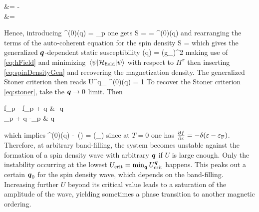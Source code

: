 		\be \begin{split}  &= -  \\ &=  \end{split} \ee
		Hence, introducing 
		\be \chi^{(0)}(\vb* q) = \sum_{\vb* p}  \ee
		one gets
		\be \mc S =  =  \chi^{(0)}(\vb* q) \ee 
		and rearranging the terms of the auto-coherent equation for the spin density
		\be \implies \mc S =   \label{eq:spinDensityGen} \ee
		which gives the generalized $\vb* q$-dependent static susceptibility 
		\be \chi(\vb* q) = (g\mu_)^2  \ee
		making use of \eqref{eq:hField} and minimizing $\ev{\mc H_\text{field}}{\psi}$ with respect to $H^x$ then inserting \eqref{eq:spinDensityGen} and recovering the magnetization density.	The generalized Stoner criterion then reads
		\be U^{\vb* q}_ \chi^{(0)}(\vb* q) = 1 \ee
		To recover the Stoner criterion \eqref{eq:stoner}, take the $\vb* q \to 0$ limit. Then 
		\be \begin{split} f_{\vb* p} - f_{\vb* p + \vb* q} &\simeq -  \cdot \vb* q \\  \varepsilon_{\vb*p + \vb* q} -\varepsilon_{\vb* p} &\simeq {} \cdot \vb* q \end{split} \ee
		which implies 
		\be \chi^{(0)}(\vb* q) \simeq -\int \dd \varepsilon \ \rho(\varepsilon)  = \rho(\varepsilon_) \ee
		since at $T=0$ one has $\pdv{f}{\varepsilon} = -\delta(\varepsilon - \varepsilon_\text{F})$. Therefore, at arbitrary band-filling, the system becomes unstable against the formation of a spin density wave with arbitrary $\vb* q$ if $U$ is large enough. Only the instability occurring at the lowest $U_\text{crit} = \min_{\vb* q} U^{\vb* q}_\text{crit}$ happens. This peaks out a certain $\vb* q_0$ for the spin density wave, which depends on the band-filling. Increasing further $U$ beyond its critical value leads to a saturation of the amplitude of the wave, yielding sometimes a phase transition to another magnetic ordering.

